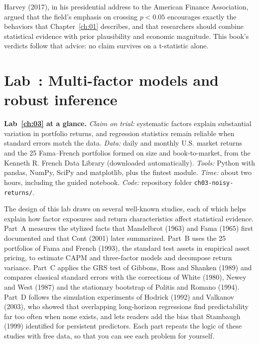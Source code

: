 Harvey (2017), in his presidential address to the American Finance Association, argued that the field's emphasis on crossing $p < 0.05$ encourages exactly the behaviors that Chapter~\ref{ch:01} describes, and that researchers should combine statistical evidence with prior plausibility and economic magnitude. This book's verdicts follow that advice: no claim survives on a t-statistic alone.

\section{Lab~\thechapter: Multi-factor models and robust inference}
\label{sec:03-lab}

\begin{callout}
\textbf{Lab~\ref{ch:03} at a glance.} \emph{Claim on trial:} systematic factors explain substantial variation in portfolio returns, and regression statistics remain reliable when standard errors match the data. \emph{Data:} daily and monthly U.S. market returns and the 25 Fama--French portfolios formed on size and book-to-market, from the Kenneth R. French Data Library (downloaded automatically). \emph{Tools:} Python with pandas, NumPy, SciPy and matplotlib, plus the fintest module. \emph{Time:} about two hours, including the guided notebook. \emph{Code:} repository folder \texttt{ch03-noisy-returns/}.
\end{callout}

The design of this lab draws on several well-known studies, each of which helps explain how factor exposures and return characteristics affect statistical evidence. Part~A measures the stylized facts that Mandelbrot (1963) and Fama (1965) first documented and that Cont (2001) later summarized. Part~B uses the 25 portfolios of Fama and French (1993), the standard test assets in empirical asset pricing, to estimate CAPM and three-factor models and decompose return variance. Part~C applies the GRS test of Gibbons, Ross and Shanken (1989) and compares classical standard errors with the corrections of White (1980), Newey and West (1987) and the stationary bootstrap of Politis and Romano (1994). Part~D follows the simulation experiments of Hodrick (1992) and Valkanov (2003), who showed that overlapping long-horizon regressions find predictability far too often when none exists, and lets readers add the bias that Stambaugh (1999) identified for persistent predictors. Each part repeats the logic of these studies with free data, so that you can see each problem for yourself.


